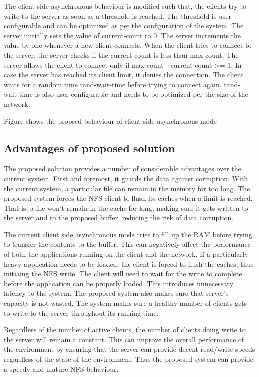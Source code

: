 \documentclass[conference]{IEEEtran}
\begin{document}
The client side asynchronous behaviour is modified such that, the clients 
try to write to the server as soon as a threshold is reached. The threshold
is user configurable and can be optimized as per the configuration of the
system. The server initially sets the value of current-count to 0. The 
server increments the value by one whenever a new client connects. When the
client tries to connect to the server, the server checks if the
current-count is less than max-count. The server allows the client to
connect only if max-count - current-count >= 1. In case the server has
reached its client limit, it denies the connection. The client waits for a
random time rand-wait-time before trying to connect again. rand-wait-time
is also user configurable and needs to be optimized per the size of the
network.

Figure shows the propsed behaviour of client side asynchronous mode
\subsection{Advantages of proposed solution}
The proposed solution provides a number of considerable advantages over the
current system. First and foremost, it guards the data against corruption.
With the current system, a particular file can remain in the memory for too
long. The proposed system forces the NFS client to flush its caches when a
limit is reached. That is, a file won't remain in the cache for long, making
sure it gets written to the server and to the proposed buffer, reducing the
risk of data corruption.

The current client side asynchronous mode tries to fill up the RAM before
trying to transfer the contents to the buffer. This can negatively affect
the performance of both the applications running on the client and the
network. If a particularly heavy application needs to be loaded, the client 
is forced to flush the caches, thus initiaing the NFS write. The client
will need to wait for the write to complete before the application can be
properly loaded. This introduces unnecessary latency to the system. The 
proposed system also makes sure that server's capacity is not wasted. The 
system makes sure a healthy number of clients gets to write to the server
throughout its running time.

Regardless of the number of active clients, the number of clients doing
write to the server will remain a constant. This can improve the overall 
performance of the environment by ensuring that the server can provide 
decent read/write speeds regardless of the state of the environment. Thus
the proposed system can provide a speedy and mature NFS behaviour.
\end{document}

